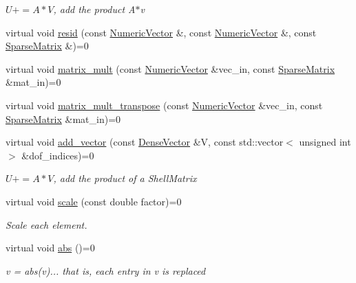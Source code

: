 \begin{DoxyCompactItemize}
\begin{DoxyCompactList}\small\item\em $U+=A*V$, add the product A$\ast$v \end{DoxyCompactList}\item 
virtual void \mbox{\hyperlink{classfemus_1_1_numeric_vector_a421d6425fa15f0addb36804fc230ca90}{resid}} (const \mbox{\hyperlink{classfemus_1_1_numeric_vector}{Numeric\+Vector}} \&, const \mbox{\hyperlink{classfemus_1_1_numeric_vector}{Numeric\+Vector}} \&, const \mbox{\hyperlink{classfemus_1_1_sparse_matrix}{Sparse\+Matrix}} \&)=0
\item 
virtual void \mbox{\hyperlink{classfemus_1_1_numeric_vector_abc7a62c82d215dcc9e6b42f7bb4ee8eb}{matrix\+\_\+mult}} (const \mbox{\hyperlink{classfemus_1_1_numeric_vector}{Numeric\+Vector}} \&vec\+\_\+in, const \mbox{\hyperlink{classfemus_1_1_sparse_matrix}{Sparse\+Matrix}} \&mat\+\_\+in)=0
\item 
virtual void \mbox{\hyperlink{classfemus_1_1_numeric_vector_a94072c3be7b12eb7fb6113f565b9e5d2}{matrix\+\_\+mult\+\_\+transpose}} (const \mbox{\hyperlink{classfemus_1_1_numeric_vector}{Numeric\+Vector}} \&vec\+\_\+in, const \mbox{\hyperlink{classfemus_1_1_sparse_matrix}{Sparse\+Matrix}} \&mat\+\_\+in)=0
\item 
virtual void \mbox{\hyperlink{classfemus_1_1_numeric_vector_acf2d25ce69856346361c65e78df281ef}{add\+\_\+vector}} (const \mbox{\hyperlink{classfemus_1_1_dense_vector}{Dense\+Vector}} \&V, const std\+::vector$<$ unsigned int $>$ \&dof\+\_\+indices)=0
\begin{DoxyCompactList}\small\item\em $U+=A*V$, add the product of a {\ttfamily Shell\+Matrix} {\ttfamily } \end{DoxyCompactList}\item 
virtual void \mbox{\hyperlink{classfemus_1_1_numeric_vector_a69a852e1b8b362836c707941bcab6f10}{scale}} (const double factor)=0
\begin{DoxyCompactList}\small\item\em Scale each element. \end{DoxyCompactList}\item 
virtual void \mbox{\hyperlink{classfemus_1_1_numeric_vector_ade0f50b972c3deecd23d54bc81bd8b19}{abs}} ()=0
\begin{DoxyCompactList}\small\item\em v = abs(v)... that is, each entry in v is replaced \end{DoxyCompactList}\item 

\end{DoxyCompactItemize}
